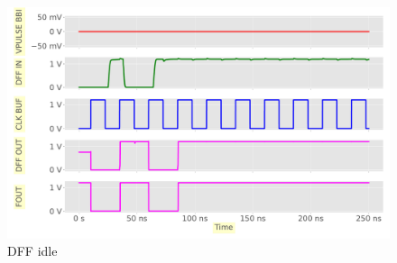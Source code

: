 
\begin{figure}[h]
	\centering
	\includegraphics[width=\columnwidth]{./figures/anim0000-cropped.pdf}
	\caption{DFF idle}
	\label{dffidle}
\end{figure}
